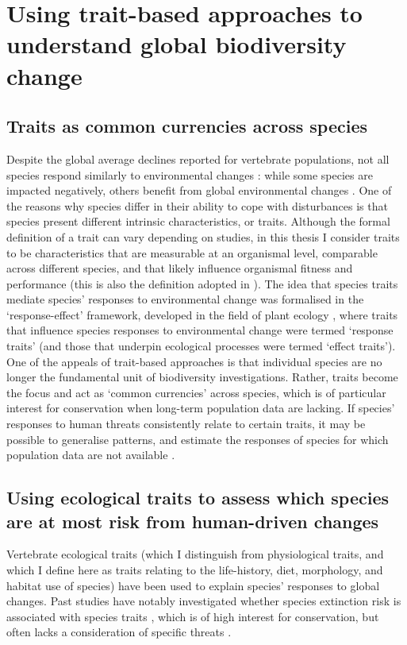 \section{Using trait-based approaches to understand global biodiversity change}

\subsection{Traits as common currencies across species}

Despite the global average declines reported for vertebrate populations, not all species respond similarly to environmental changes \citep{Dornelas2019, Leung2020}: while some species are impacted negatively, others benefit from global environmental changes \citep{Thomas2013, Newbold2018a}. One of the reasons why species differ in their ability to cope with disturbances is that species present different intrinsic characteristics, or traits. Although the formal definition of a trait can vary depending on studies, in this thesis I consider traits to be characteristics that are measurable at an organismal level, comparable across different species, and that likely influence organismal fitness and performance (this is also the definition adopted in \citet{McGill2006}). The idea that species traits mediate species' responses to environmental change was formalised in the `response-effect' framework, developed in the field of plant ecology \citep{Lavorel2002a}, where traits that influence species responses to environmental change were termed `response traits' (and those that underpin ecological processes were termed `effect traits'). One of the appeals of trait-based approaches is that individual species are no longer the fundamental unit of biodiversity investigations. Rather, traits become the focus and act as `common currencies' across species, which is of particular interest for conservation when long-term population data are lacking. If species' responses to human threats consistently relate to certain traits, it may be possible to generalise patterns, and estimate the responses of species for which population data are not available \citep{Verberk2013}. 

\subsection{Using ecological traits to assess which species are at most risk from human-driven changes}

Vertebrate ecological traits (which I distinguish from physiological traits, and which I define here as traits relating to the life-history, diet, morphology, and habitat use of species) have been used to explain species' responses to global changes. Past studies have notably investigated whether species extinction risk is associated with species traits \citep{Lebreton2011, Ripple2017, Chichorro2019}, which is of high interest for conservation, but often lacks a consideration of specific threats \citep{GonzalezSuarez2013}. 

